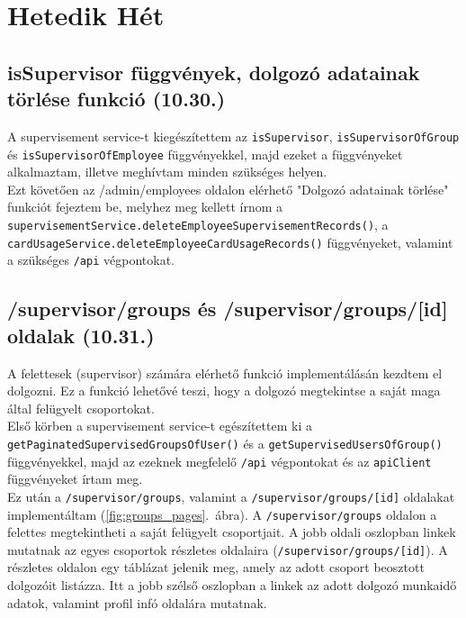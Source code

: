 \documentclass[a4paper]{article}
\newcommand{\inltxt}[1]{\texttt{#1}}
\begin{document}
\section{Hetedik Hét}

\subsection{isSupervisor függvények, dolgozó adatainak törlése funkció (10.30.)}

A supervisement service-t kiegészítettem az \inltxt{isSupervisor}, \inltxt{isSupervisorOfGroup} és
\inltxt{isSupervisorOfEmployee} függvényekkel, majd ezeket a függvényeket alkalmaztam, illetve
meghívtam minden szükséges helyen. \\

Ezt követően az /admin/employees oldalon elérhető "Dolgozó adatainak törlése" funkciót fejeztem
be, melyhez meg kellett írnom a
\inltxt{supervisementService.deleteEmployeeSupervisementRecords()}, a
\inltxt{cardUsageService.deleteEmployeeCardUsageRecords()} függvényeket, valamint a
szükséges \inltxt{/api} végpontokat.


\subsection{/supervisor/groups és /supervisor/groups/[id] oldalak (10.31.)}

A felettesek (supervisor) számára elérhető funkció implementálásán kezdtem el dolgozni. Ez a funkció
lehetővé teszi, hogy a dolgozó megtekintse a saját maga által felügyelt csoportokat. \\

Első körben a supervisement service-t egészítettem ki a
\inltxt{getPaginatedSupervisedGroupsOfUser()} és a \inltxt{getSupervisedUsersOfGroup()}
függvényekkel, majd az ezeknek megfelelő \inltxt{/api} végpontokat és az \inltxt{apiClient} függvényeket írtam
meg.\\

Ez után a \inltxt{/supervisor/groups}, valamint a \inltxt{/supervisor/groups/[id]} oldalakat
implementáltam (\ref{fig:groups_pages}.~ábra). A \inltxt{/supervisor/groups} oldalon a felettes megtekintheti a saját felügyelt
csoportjait. A jobb oldali oszlopban linkek mutatnak az egyes csoportok részletes oldalaira
(\inltxt{/supervisor/groups/[id]}). A részletes oldalon egy táblázat jelenik meg, amely az adott csoport
beosztott dolgozóit listázza. Itt a jobb szélső oszlopban a linkek az adott dolgozó munkaidő adatok,
valamint profil infó oldalára mutatnak.
\end{document}
